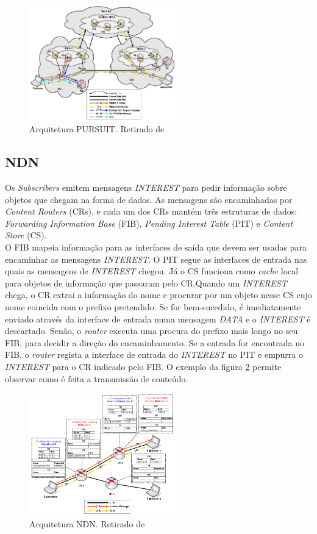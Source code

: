 \documentclass[conference]{IEEEtran}
\begin{document}
\begin{figure}[!t]
\centering
\includegraphics[width=2.5in]{pursuit}
\caption{Arquitetura PURSUIT. Retirado de \cite{surveyICN}}
\label{pursuit}
\end{figure}


\subsection{NDN}

Os \textit{Subscribers} emitem mensagens \textit{INTEREST} para pedir informa\c{c}\~{a}o sobre objetos que chegam na forma de dados. As mensagens s\~{a}o encaminhadas por \textit{Content Routers} (CRs), e cada um dos CRs mant\'{e}m tr\^{e}s estruturas de dados: \textit{Forwarding Information Base} (FIB), \textit{Pending Interest Table} (PIT) e \textit{Content Store} (CS). \\

O FIB mapeia informa\c{c}\~{a}o para as interfaces de sa\'{i}da que devem ser usadas para encaminhar as mensagens \textit{INTEREST}. O PIT segue as interfaces de entrada nas quais as mensagens de \textit{INTEREST} chegou. J\'{a} o CS funciona como \textit{cache} local para objetos de informa\c{c}\~{a}o que passaram pelo CR.Quando um \textit{INTEREST} chega, o CR extrai a informa\c{c}\~{a}o do nome e procurar por um objeto nesse CS cujo nome coincida com o prefixo pretendido. Se for bem-sucedido, \'{e} imediatamente enviado atrav\'{e}s da interface de entrada numa mensagem \textit{DATA} e o \textit{INTEREST} \'{e} descartado. Sen\~{a}o, o \textit{router} executa uma procura do prefixo mais longo no seu FIB, para decidir a dire\c{c}\~{a}o do encaminhamento. Se a entrada for encontrada no FIB, o \textit{router} regista a interface de entrada do \textit{INTEREST} no PIT e empurra o \textit{INTEREST} para o CR indicado pelo FIB. O exemplo da figura \ref{ndn} permite observar como \'{e} feita a transmiss\~{a}o de conte\'{u}do.\\

\begin{figure}[!t]
\centering
\includegraphics[width=2.5in]{ndn}
\caption{Arquitetura NDN. Retirado de \cite{surveyICN}}
\label{ndn}
\end{figure}
\end{document}
